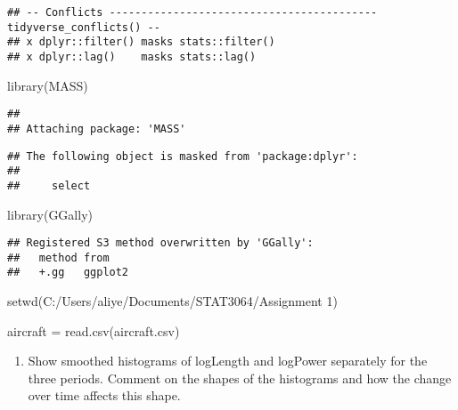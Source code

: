 \documentclass[
]{article}
\newenvironment{Shaded}{\begin{snugshade}}{\end{snugshade}}
\newcommand{\FunctionTok}[1]{\textcolor[rgb]{0.00,0.00,0.00}{#1}}
\newcommand{\NormalTok}[1]{#1}
\newcommand{\OtherTok}[1]{\textcolor[rgb]{0.56,0.35,0.01}{#1}}
\newcommand{\StringTok}[1]{\textcolor[rgb]{0.31,0.60,0.02}{#1}}
\providecommand{\tightlist}{%
  \setlength{\itemsep}{0pt}\setlength{\parskip}{0pt}}
\begin{document}
\begin{verbatim}
## -- Conflicts ------------------------------------------ tidyverse_conflicts() --
## x dplyr::filter() masks stats::filter()
## x dplyr::lag()    masks stats::lag()
\end{verbatim}

\begin{Shaded}
\begin{Highlighting}[]
\FunctionTok{library}\NormalTok{(MASS)}
\end{Highlighting}
\end{Shaded}

\begin{verbatim}
## 
## Attaching package: 'MASS'
\end{verbatim}

\begin{verbatim}
## The following object is masked from 'package:dplyr':
## 
##     select
\end{verbatim}

\begin{Shaded}
\begin{Highlighting}[]
\FunctionTok{library}\NormalTok{(GGally)}
\end{Highlighting}
\end{Shaded}

\begin{verbatim}
## Registered S3 method overwritten by 'GGally':
##   method from   
##   +.gg   ggplot2
\end{verbatim}

\begin{Shaded}
\begin{Highlighting}[]
\FunctionTok{setwd}\NormalTok{(}\StringTok{\textquotesingle{}C:/Users/aliye/Documents/STAT3064/Assignment 1\textquotesingle{}}\NormalTok{)}

\NormalTok{aircraft }\OtherTok{=} \FunctionTok{read.csv}\NormalTok{(}\StringTok{\textquotesingle{}aircraft.csv\textquotesingle{}}\NormalTok{)}
\end{Highlighting}
\end{Shaded}

\begin{enumerate}
\def\labelenumi{\alph{enumi})}
\tightlist
\item
  Show smoothed histograms of logLength and logPower separately for the
  three periods. Comment on the shapes of the histograms and how the
  change over time affects this shape.
\end{enumerate}
\end{document}

